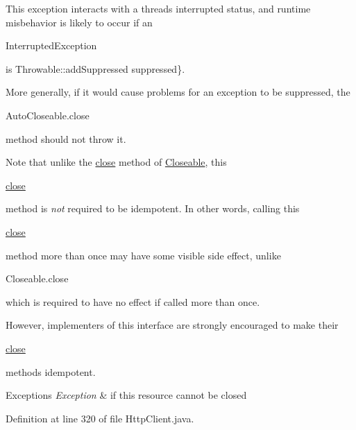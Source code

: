 This exception interacts with a thread\textquotesingle{}s interrupted status, and runtime misbehavior is likely to occur if an
\begin{DoxyCode}
InterruptedException 
\end{DoxyCode}
 is  Throwable\+::add\+Suppressed suppressed\}. 

More generally, if it would cause problems for an exception to be suppressed, the
\begin{DoxyCode}
AutoCloseable.close 
\end{DoxyCode}
 method should not throw it. 

Note that unlike the \hyperlink{}{close} method of \hyperlink{}{Closeable}, this
\begin{DoxyCode}
\hyperlink{classedu_1_1sjsu_1_1amigo_1_1http_1_1client_1_1_http_client_a5807fb0dab40c227bb34ffc14e708294}{close} 
\end{DoxyCode}
 method is {\itshape not} required to be idempotent. In other words, calling this
\begin{DoxyCode}
\hyperlink{classedu_1_1sjsu_1_1amigo_1_1http_1_1client_1_1_http_client_a5807fb0dab40c227bb34ffc14e708294}{close} 
\end{DoxyCode}
 method more than once may have some visible side effect, unlike
\begin{DoxyCode}
Closeable.close 
\end{DoxyCode}
 which is required to have no effect if called more than once. 

However, implementers of this interface are strongly encouraged to make their
\begin{DoxyCode}
\hyperlink{classedu_1_1sjsu_1_1amigo_1_1http_1_1client_1_1_http_client_a5807fb0dab40c227bb34ffc14e708294}{close} 
\end{DoxyCode}
 methods idempotent.


\begin{DoxyExceptions}{Exceptions}
{\em Exception} & if this resource cannot be closed \\
\hline
\end{DoxyExceptions}


Definition at line 320 of file Http\+Client.\+java.

\mbox{\label{classedu_1_1sjsu_1_1amigo_1_1http_1_1client_1_1_http_client_abe7f89358f3414a949b1bc5390c34f06}} 
